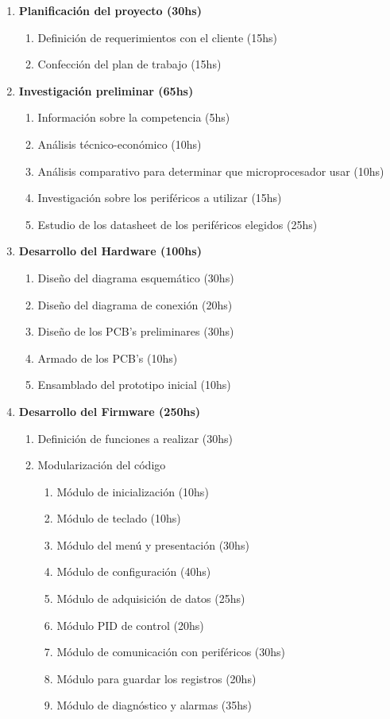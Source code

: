 \documentclass[11pt]{charter}
\begin{document}
\begin{enumerate}
	\item \textbf{Planificación del proyecto (30hs)}
	\begin{enumerate}[label*=\arabic*.]
		\item Definición de requerimientos con el cliente (15hs)
		\item Confección del plan de trabajo (15hs)
	\end{enumerate}

	\item \textbf{Investigación preliminar (65hs)}
	\begin{enumerate}[label*=\arabic*.]
		\item Información sobre la competencia (5hs)
		\item Análisis técnico-económico (10hs)
		\item Análisis comparativo para determinar que microprocesador usar (10hs)	
		\item Investigación sobre los periféricos a utilizar (15hs)
		\item Estudio de los datasheet de los periféricos elegidos (25hs)   
	\end{enumerate}

	\item \textbf{Desarrollo del Hardware (100hs)}
	\begin{enumerate}[label*=\arabic*.]
		\item Diseño del diagrama esquemático (30hs)
		\item Diseño del diagrama de conexión (20hs)
		\item Diseño de los PCB's preliminares (30hs)	
		\item Armado de los PCB's  (10hs)
		\item Ensamblado del prototipo inicial (10hs)   
	\end{enumerate}
	
	\item \textbf{Desarrollo del Firmware (250hs)}
	\begin{enumerate}[label*=\arabic*.]
		\item Definición de funciones a realizar (30hs)
		\item Modularización del código
			\begin{enumerate}[label*=\arabic*.]
				\item Módulo de inicialización (10hs)
				\item Módulo de teclado (10hs)
				\item Módulo del menú y presentación (30hs)
				\item Módulo de configuración (40hs)
				\item Módulo de adquisición de datos (25hs)
				\item Módulo PID de control (20hs)	
				\item Módulo de comunicación con periféricos (30hs)
				\item Módulo para guardar los registros  (20hs)
				\item Módulo de diagnóstico y alarmas (35hs)   
			\end{enumerate}	  
	\end{enumerate}
	

\end{enumerate}
\end{document}

